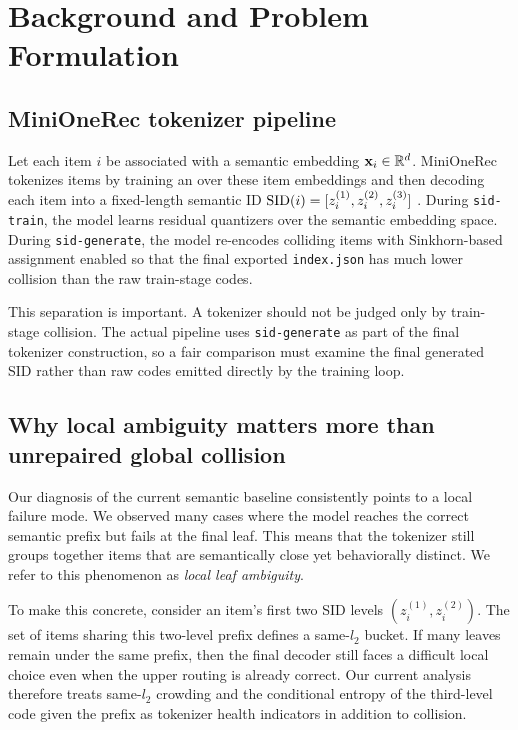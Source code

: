 \section{Background and Problem Formulation}
\label{sec:background}

\subsection{MiniOneRec tokenizer pipeline}

Let each item $i$ be associated with a semantic embedding $\mathbf{x}_i \in \mathbb{R}^d$. MiniOneRec tokenizes items by training an \rqvae{} over these item embeddings and then decoding each item into a fixed-length semantic ID $\mathrm{SID}(i) = [z_i^{(1)}, z_i^{(2)}, z_i^{(3)}]$ \citep{kong2025minionerec,lee2022rqvae}. During \texttt{sid-train}, the model learns residual quantizers over the semantic embedding space. During \texttt{sid-generate}, the model re-encodes colliding items with Sinkhorn-based assignment enabled so that the final exported \texttt{index.json} has much lower collision than the raw train-stage codes.

This separation is important. A tokenizer should not be judged only by train-stage collision. The actual pipeline uses \texttt{sid-generate} as part of the final tokenizer construction, so a fair comparison must examine the final generated SID rather than raw codes emitted directly by the training loop.

\subsection{Why local ambiguity matters more than unrepaired global collision}

Our diagnosis of the current semantic baseline consistently points to a local failure mode. We observed many cases where the model reaches the correct semantic prefix but fails at the final leaf. This means that the tokenizer still groups together items that are semantically close yet behaviorally distinct. We refer to this phenomenon as \emph{local leaf ambiguity}.

To make this concrete, consider an item's first two SID levels $(z_i^{(1)}, z_i^{(2)})$. The set of items sharing this two-level prefix defines a same-$l_2$ bucket. If many leaves remain under the same prefix, then the final decoder still faces a difficult local choice even when the upper routing is already correct. Our current analysis therefore treats same-$l_2$ crowding and the conditional entropy of the third-level code given the prefix as tokenizer health indicators in addition to collision.

